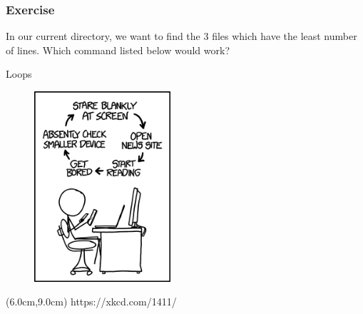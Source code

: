 \documentclass{beamer}
\begin{document}
\begin{frame}
\frametitle{Exercise}
In our current directory, we want to find the 3 files which have the least number of lines. Which command listed below would work?

\end{frame}



\begin{frame}{Loops}

\begin{figure}[htbp]
   \centering
   \includegraphics[width=0.45\textwidth]{../fig/loops.png}
\end{figure}

\begin{textblock*}{7cm}(6.0cm,9.0cm)
		\centering
			\tiny{https://xkcd.com/1411/ }
\end{textblock*}

\end{frame}
\end{document}
